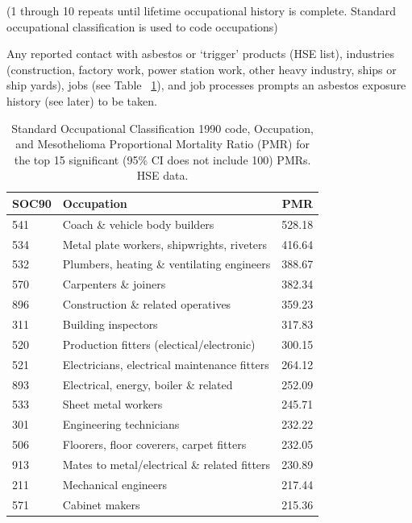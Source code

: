 \documentclass[a4paper,10pt]{article}
\begin{document}
(1 through 10 repeats until lifetime occupational history is complete. Standard occupational classification is used to code occupations)

Any reported contact with asbestos or `trigger' products (HSE list), industries (construction, factory work, power station work, other heavy industry, ships or ship yards), jobs (see Table ~\ref{table:top15pmr}), and job processes prompts an asbestos exposure history (see later) to be taken.

\begin{table}
\begin{tabular}{llr}
\textbf{SOC90} &                                     \textbf{Occupation} &    \textbf{PMR} \\
\midrule
541 &                      Coach \& vehicle body builders &  528.18 \\
534 &          Metal plate workers, shipwrights, riveters &  416.64 \\
532 &         Plumbers, heating \& ventilating engineers  &  388.67 \\
570 &                               Carpenters \& joiners &  382.34 \\ 
896 &                  Construction \& related operatives &  359.23 \\
311 &                                 Building inspectors &  317.83 \\  
520 &           Production fitters (electical/electronic) &  300.15 \\
521 &        Electricians, electrical maintenance fitters &  264.12 \\
893 &  Electrical, energy, boiler \& related              &  252.09 \\
533 &                                 Sheet metal workers &  245.71 \\
301 &    Engineering technicians                          &  232.22 \\
506 &            Floorers, floor coverers, carpet fitters &  232.05 \\
913 &        Mates to metal/electrical \& related fitters &  230.89 \\
211 &                                Mechanical engineers &  217.44 \\
571 &                                      Cabinet makers &  215.36 \\ 
\bottomrule
\end{tabular}
\caption{Standard Occupational Classification 1990 code, Occupation, and Mesothelioma Proportional Mortality Ratio (PMR) for the top 15 significant (95\% CI does not include 100) PMRs. HSE data.}
\label{table:top15pmr}
\end{table}
\end{document}
